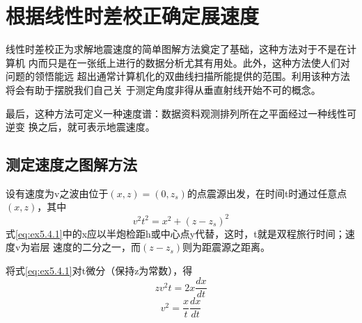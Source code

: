 \section{根据线性时差校正确定展速度}
\label{sec:5.4}

线性时差校正为求解地震速度的简单图解方法奠定了基础，这种方法对于不是在计算机
内而只是在一张纸上进行的数据分析尤其有用处。此外，这种方法使人们对问题的领悟能远
超出通常计算机化的双曲线扫描所能提供的范围。利用该种方法将会有助于摆脱我们自己关
于测定角度非得从垂直射线开始不可的概念。

最后，这种方法可定义一种速度谱：数据资料观测排列所在之平面经过一种线性可逆变
换之后，就可表示地震速度。

\subsection{测定速度之图解方法}
\label{sec:5.4.1}

设有速度为v之波由位于$(x,z)=(0,z_s)$的点震源出发，在时间t时通过任意点
$(x,z)$，其中
\begin{equation}
v^2t^2=x^2+(z-z_s)^2
\label{eq:ex5.4.1}
\end{equation}
式\ref{eq:ex5.4.1}中的x应以半炮检距h或中心点y代替，这时，t就是双程旅行时间；速度v为岩层
速度的二分之一，而$(z-z_s)$则为距震源之距离。

将式\ref{eq:ex5.4.1}对t微分（保持z为常数），得
\begin{equation}
zv^2t=2x\frac{dx}{dt}
\label{eq:ex5.4.2}
\end{equation}
\begin{equation}
v^2=\frac{x}{t}\frac{dx}{dt}
\label{eq:ex5.4.3}
\end{equation}




